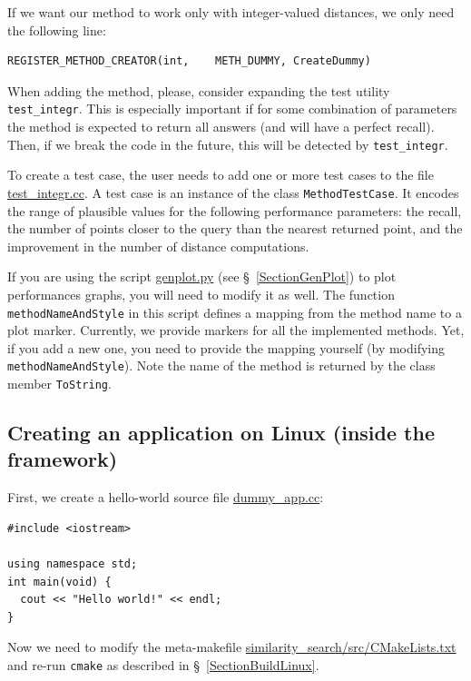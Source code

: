 \documentclass[runningheads,a4paper]{llncs}
\newcommand{\replocfile}{https://github.com/searchivarius/NonMetricSpaceLib/blob/develop/}
\newcommand{\ttt}[1]{\texttt{#1}}
\begin{document}
If we want our method to work only with integer-valued distances,
we only need the following line:
\begin{verbatim}
REGISTER_METHOD_CREATOR(int,    METH_DUMMY, CreateDummy)
\end{verbatim}

When adding the method, please, consider expanding
the test utility \ttt{test\_integr}.
This is especially important if for some combination of parameters the method is expected
to return all answers (and will have a perfect recall). Then, if we break the code in the future,
this will be detected by \ttt{test\_integr}.

To create a test case, the user needs to add one or more test cases 
to the file
\href{\replocfile similarity_search/test/test_integr.cc#L65}{test\_integr.cc}. 
A test case is an instance of the class \ttt{MethodTestCase}. 
It encodes the range of plausible values
for the following performance parameters: the recall,
the number of points closer to the query than the nearest returned point,
and the improvement in the number of distance computations.

If you are using the script  \href{\replocfile sample_scripts/genplot.py#L222}{genplot.py} (see \S~\ref{SectionGenPlot}) to plot performances graphs, you will need to modify it as well.
The function \ttt{methodNameAndStyle} in this script defines a mapping from the method name
to a plot marker. Currently, we provide markers for all the implemented methods. 
Yet, if you add a new one, you need to provide the mapping yourself (by modifying \ttt{methodNameAndStyle}).
Note the name of the method is returned by the class member \ttt{ToString}.

\subsection{Creating an application on Linux (inside the framework)}\label{SectionCreateAppLinux}
First, we create a hello-world source file 
\href{\replocfile similarity_search/src/dummy_app.cc}{dummy\_app.cc}:
\begin{verbatim}
#include <iostream>

using namespace std;
int main(void) {
  cout << "Hello world!" << endl;
}
\end{verbatim}
Now we need to modify the meta-makefile
\href{\replocfile similarity_search/src/CMakeLists.txt}{similarity\_search/src/CMakeLists.txt} and 
re-run \ttt{cmake} as described in \S~\ref{SectionBuildLinux}.
\end{document}
